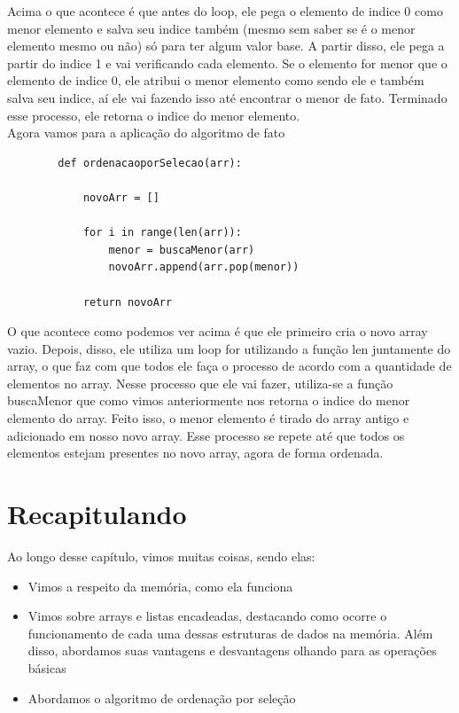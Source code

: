 \documentclass{report}
\begin{document}
	Acima o que acontece é que antes do loop, ele pega o elemento de indice 0 como menor elemento e salva seu indice também (mesmo sem saber se é o menor elemento mesmo ou não) só para ter algum valor base. A partir disso, ele pega a partir do indice 1 e vai verificando cada elemento. Se o elemento for menor que o elemento de indice 0, ele atribui o menor elemento como sendo ele e também salva seu indice, aí ele vai fazendo isso até encontrar o menor de fato. Terminado esse processo, ele retorna o indice do menor elemento. \\
	
	Agora vamos para a aplicação do algoritmo de fato
	
	\begin{verbatim}
		def ordenacaoporSelecao(arr):
		
			novoArr = []
		
			for i in range(len(arr)):
				menor = buscaMenor(arr)
				novoArr.append(arr.pop(menor))
			
			return novoArr
	\end{verbatim}
	
	O que acontece como podemos ver acima é que ele primeiro cria o novo array vazio. Depois, disso, ele utiliza um loop for utilizando a função len juntamente do array, o que faz com que todos ele faça o processo de acordo com a quantidade de elementos no array. Nesse processo que ele vai fazer, utiliza-se a função buscaMenor que como vimos anteriormente nos retorna o indice do menor elemento do array. Feito isso, o menor elemento é tirado do array antigo e adicionado em nosso novo array. Esse processo se repete até que todos os elementos estejam presentes no novo array, agora de forma ordenada.
	
	\section{Recapitulando}
	
	Ao longo desse capítulo, vimos muitas coisas, sendo elas:
	
	\begin{itemize}
		\item Vimos a respeito da memória, como ela funciona
		\item Vimos sobre arrays e listas encadeadas, destacando como ocorre o funcionamento de cada uma dessas estruturas de dados na memória. Além disso, abordamos suas vantagens e desvantagens olhando para as operações básicas
		\item Abordamos o algoritmo de ordenação por seleção
	\end{itemize}
	
\end{document}

